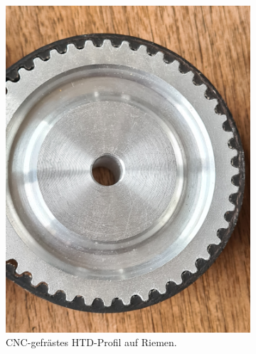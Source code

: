 		\begin{figure}[h]
			\centering
			\begin{subfigure}{.49\textwidth}
				\centering
				\includegraphics[width=\textwidth]{Footage/Pictures/Machined-HTD_tooth_fit.jpg}
				\caption{CNC-gefrästes HTD-Profil auf Riemen.}%
				\label{subfig:machined HTD}
			\end{subfigure}
			\hfill
			\begin{subfigure}{.49\textwidth}
				\centering

\end{subfigure}
\end{figure}
